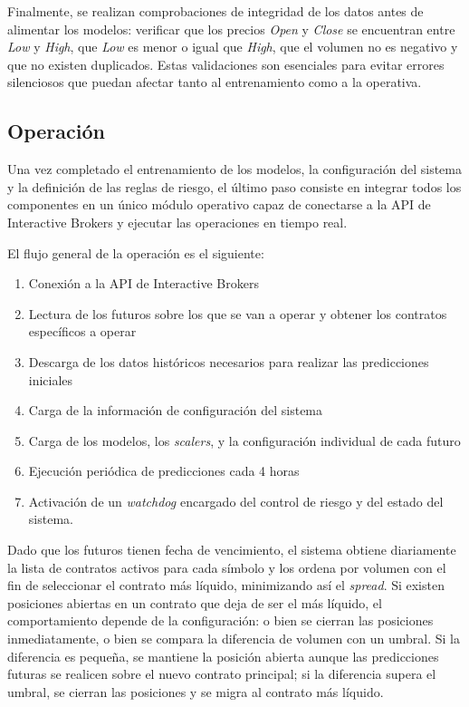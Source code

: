 Finalmente, se realizan comprobaciones de integridad de los datos antes de alimentar los modelos: verificar que los precios \textit{Open} y
\textit{Close} se encuentran entre \textit{Low} y \textit{High}, que \textit{Low} es menor o igual que \textit{High}, que el volumen no es negativo y
que no existen duplicados. Estas validaciones son esenciales para evitar errores silenciosos que puedan afectar tanto al entrenamiento como a la
operativa.

\subsection{Operación}

Una vez completado el entrenamiento de los modelos, la configuración del sistema y la definición de las reglas de riesgo, el último paso consiste en
integrar todos los componentes en un único módulo operativo capaz de conectarse a la API de Interactive Brokers y ejecutar las operaciones en tiempo
real.

El flujo general de la operación es el siguiente:

\begin{enumerate}
    \item Conexión a la API de Interactive Brokers
    \item Lectura de los futuros sobre los que se van a operar y obtener los contratos específicos a operar
    \item Descarga de los datos históricos necesarios para realizar las predicciones iniciales
    \item Carga de la información de configuración del sistema
    \item Carga de los modelos, los \textit{scalers}, y la configuración individual de cada futuro
    \item Ejecución periódica de predicciones cada 4 horas
    \item Activación de un \textit{watchdog} encargado del control de riesgo y del estado del sistema.
\end{enumerate}

Dado que los futuros tienen fecha de vencimiento, el sistema obtiene diariamente la lista de contratos activos para cada símbolo y los ordena por
volumen con el fin de seleccionar el contrato más líquido, minimizando así el \textit{spread}. Si existen posiciones abiertas en un contrato que deja
de ser el más líquido, el comportamiento depende de la configuración: o bien se cierran las posiciones inmediatamente, o bien se compara la diferencia
de volumen con un umbral. Si la diferencia es pequeña, se mantiene la posición abierta aunque las predicciones futuras se realicen sobre el nuevo
contrato principal; si la diferencia supera el umbral, se cierran las posiciones y se migra al contrato más líquido.

